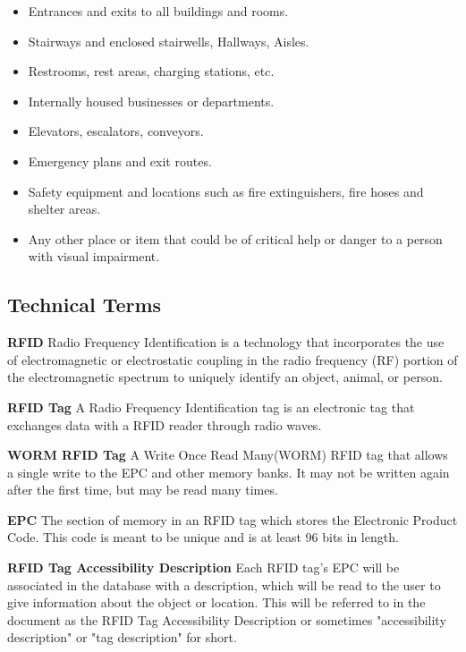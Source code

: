 \documentclass{article}
\begin{document}
\begin{itemize}
  \item Entrances and exits to all buildings and rooms.
  \item Stairways and enclosed stairwells, Hallways, Aisles.
  \item Restrooms, rest areas, charging stations, etc.
  \item Internally housed businesses or departments.
  \item Elevators, escalators, conveyors.
  \item Emergency plans and exit routes.
  \item Safety equipment and locations such as fire extinguishers, fire hoses and shelter areas.
  \item Any other place or item that could be of critical help or danger to a person with visual impairment.
\end{itemize}

\subsection{Technical Terms}

\textbf{RFID}
\newline
Radio Frequency Identification is a technology that incorporates the use of electromagnetic or electrostatic coupling in the radio frequency (RF) portion of the electromagnetic spectrum to uniquely identify an object, animal, or person. \medskip

\textbf{RFID Tag}
\newline
A Radio Frequency Identification tag is an electronic tag that exchanges data with a RFID reader through radio waves. \medskip

\textbf{WORM RFID Tag}
\newline
A Write Once Read Many(WORM) RFID tag that allows a single write to the EPC and other memory banks. It may not be written again after the first time, but may be read many times. \medskip

\textbf{EPC}
\newline
The section of memory in an RFID tag which stores the Electronic Product Code. This code is meant to be unique and is at least 96 bits in length. \medskip

\textbf{RFID Tag Accessibility Description}
\newline
Each RFID tag's EPC will be associated in the database with a description, which will be read to the user to give information about the object or location. This will be referred to in the document as the RFID Tag Accessibility Description or sometimes "accessibility description" or "tag description" for short.  \medskip
\end{document}
